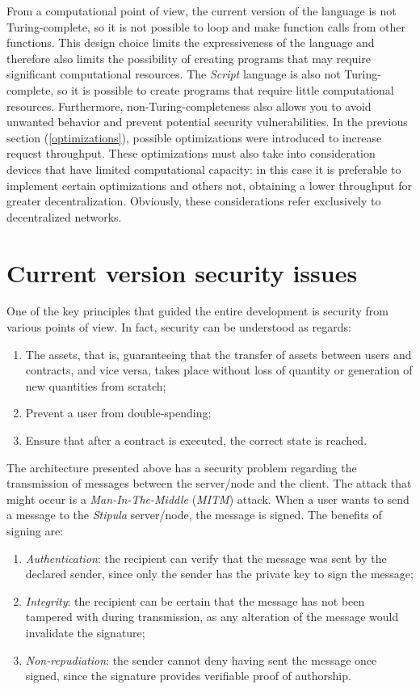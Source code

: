 From a computational point of view, the current version of the language is not Turing-complete, so it is not 
possible to loop and make function calls from other functions. This design choice limits the expressiveness 
of the language and therefore also limits the possibility of creating programs that may require significant 
computational resources. The \textit{Script} language is also not Turing-complete, so it is possible to 
create programs that require little computational resources. Furthermore, non-Turing-completeness also 
allows you to avoid unwanted behavior and prevent potential security vulnerabilities. In the previous 
section (\ref{optimizations}), possible optimizations were introduced to increase request throughput. These 
optimizations must also take into consideration devices that have limited computational capacity: in this 
case it is preferable to implement certain optimizations and others not, obtaining a lower throughput for 
greater decentralization. Obviously, these considerations refer exclusively to decentralized networks.

\newpage
\section{Current version security issues}

One of the key principles that guided the entire development is security from various points of view. In 
fact, security can be understood as regards:
\begin{enumerate}
   \item The assets, that is, guaranteeing that the transfer of assets between users and contracts, and vice 
   versa, takes place without loss of quantity or generation of new quantities from scratch;
   \item Prevent a user from double-spending;
   \item Ensure that after a contract is executed, the correct state is reached.
\end{enumerate}

The architecture presented above has a security problem regarding the transmission of messages between the 
server/node and the client. The attack that might occur is a \textit{Man-In-The-Middle} (\textit{MITM}) 
attack. When a user wants to send a message to the \textit{Stipula} server/node, the message is signed. The 
benefits of signing are:
\begin{enumerate}
   \item \textit{Authentication}: the recipient can verify that the message was sent by the declared sender, 
   since only the sender has the private key to sign the message;
   \item \textit{Integrity}: the recipient can be certain that the message has not been tampered with during 
   transmission, as any alteration of the message would invalidate the signature;
   \item \textit{Non-repudiation}: the sender cannot deny having sent the message once signed, since the 
   signature provides verifiable proof of authorship.
\end{enumerate}

